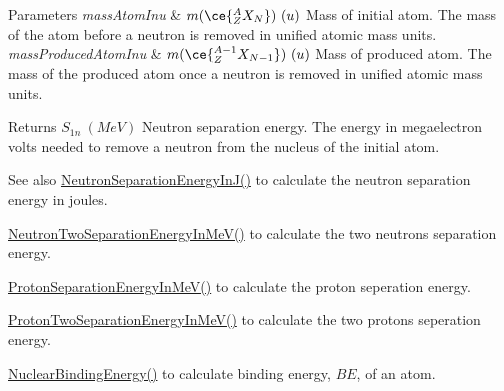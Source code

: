 \begin{DoxyParams}{Parameters}
{\em mass\+Atom\+Inu} & $m(\ce{ ^{A}_{Z}X_{N} })\ (u)$ Mass of initial atom. The mass of the atom before a neutron is removed in unified atomic mass units. \\
\hline
{\em mass\+Produced\+Atom\+Inu} & $m(\ce{ ^{A-1}_{Z}X_{N-1} })\ (u)$ Mass of produced atom. The mass of the produced atom once a neutron is removed in unified atomic mass units. \\
\hline
\end{DoxyParams}
\begin{DoxyReturn}{Returns}
$S_{1n}\ (MeV)$ Neutron separation energy. The energy in megaelectron volts needed to remove a neutron from the nucleus of the initial atom. 
\end{DoxyReturn}
\begin{DoxySeeAlso}{See also}
\mbox{\hyperlink{group___e_g_x_phys-_nuclear_separation_energy_ga14a4bb972ae000ef4ff35f2734ff22d0}{Neutron\+Separation\+Energy\+In\+J()}} to calculate the neutron separation energy in joules. 

\mbox{\hyperlink{group___e_g_x_phys-_nuclear_separation_energy_ga09985fc876eb632695bfbc1f2f325401}{Neutron\+Two\+Separation\+Energy\+In\+Me\+V()}} to calculate the two neutrons separation energy. 

\mbox{\hyperlink{group___e_g_x_phys-_nuclear_separation_energy_ga6a619ded55c47ed22ea2d8a85202ebeb}{Proton\+Separation\+Energy\+In\+Me\+V()}} to calculate the proton seperation energy. 

\mbox{\hyperlink{group___e_g_x_phys-_nuclear_separation_energy_ga0de42783a7c650eb32f85dc2d40d84d7}{Proton\+Two\+Separation\+Energy\+In\+Me\+V()}} to calculate the two protons seperation energy. 

\mbox{\hyperlink{group___e_g_x_phys-_nuclear_binding_energy_gafea41a3c21704414394c3204b35aba98}{Nuclear\+Binding\+Energy()}} to calculate binding energy, $BE$, of an atom. 
\end{DoxySeeAlso}
